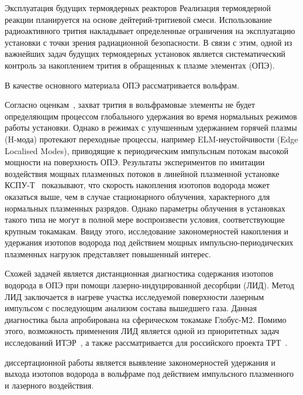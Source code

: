 Эксплуатация будущих термоядерных реакторов
Реализация термоядерной реакции планируется на основе дейтерий-тритиевой смеси. Использование радиоактивного трития накладывает определенные ограничения на эксплуатацию установки с точки зрения радиационной безопасности. В связи с этим, одной из важнейших задач будущих термоядерных установок является систематический контроль за накоплением трития в обращенных к плазме элементах (ОПЭ). 

В качестве основного материала ОПЭ рассматривается вольфрам. 

Согласно оценкам~\cite{Roth1}, захват трития в вольфрамовые элементы не будет определяющим 
процессом глобального удержания во время нормальных режимов работы установки. Однако в режимах с улучшенным удержанием горячей плазмы (H-мода) протекают 
переходные процессы, например ELM-неустойчивости (Edge Localised Modes), приводящие к периодическим импульсным потокам высокой мощности на поверхность ОПЭ. 
Результаты экспериментов по имитации воздействия мощных плазменных потоков в линейной плазменной установке КСПУ-Т~\cite{Ogorodnikova} показывают, что скорость 
накопления изотопов водорода может оказаться выше, чем в случае стационарного облучения, характерного для нормальных плазменных разрядов. Однако параметры 
облучения в установках такого типа не могут в полной мере воспроизвести условия, соответствующие крупным токамакам. Ввиду этого, исследование закономерностей 
накопления и удержания изотопов водорода под действием мощных импульсно-периодических плазменных нагрузок представляет повышенный интерес.
 
Схожей задачей является дистанционная диагностика содержания изотопов водорода в ОПЭ при помощи лазерно-индуцированной десорбции (ЛИД). Метод ЛИД 
заключается в нагреве участка исследуемой поверхности лазерным импульсом с последующим анализом состава вышедшего газа. Данная диагностика была апробирована 
на сферическом токамаке Глобус-М2. Помимо этого, возможность применения ЛИД является одной из приоритетных задач исследований ИТЭР~\cite{loarte2020required}, 
а также рассматривается для российского проекта ТРТ~\cite{Razdobarin2022}.

{\aim} диссертационной работы является выявление закономерностей удержания и выхода изотопов водорода в вольфраме под действием импульсного плазменного и 
лазерного воздействия.

